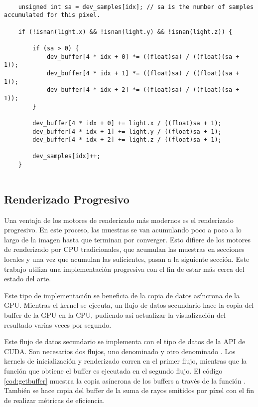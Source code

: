 \begin{minipage}[c]{0.95\textwidth}
\begin{lstlisting}[label={cod:sampleaccumulation}, caption={Código para la acumulación de luz por cada píxel}]
	
	unsigned int sa = dev_samples[idx]; // sa is the number of samples accumulated for this pixel.
	
	if (!isnan(light.x) && !isnan(light.y) && !isnan(light.z)) {

        if (sa > 0) {
            dev_buffer[4 * idx + 0] *= ((float)sa) / ((float)(sa + 1));
            dev_buffer[4 * idx + 1] *= ((float)sa) / ((float)(sa + 1));
            dev_buffer[4 * idx + 2] *= ((float)sa) / ((float)(sa + 1));
        }

        dev_buffer[4 * idx + 0] += light.x / ((float)sa + 1);
        dev_buffer[4 * idx + 1] += light.y / ((float)sa + 1);
        dev_buffer[4 * idx + 2] += light.z / ((float)sa + 1);

        dev_samples[idx]++;
    }
	
\end{lstlisting}
\end{minipage}
	
\subsection{Renderizado Progresivo}
\label{progressiverender}
		
Una ventaja de los motores de renderizado más modernos es el renderizado progresivo. En este proceso, las muestras se van acumulando poco a poco a lo largo de la imagen hasta que terminan por converger. Esto difiere de los motores de renderizado por CPU tradicionales, que acumulan las muestras en secciones locales y una vez que acumulan las suficientes, pasan a la siguiente sección. Este trabajo utiliza una implementación progresiva con el fin de estar más cerca del estado del arte.

Este tipo de implementación se beneficia de la copia de datos asíncrona de la GPU. Mientras el kernel se ejecuta, un flujo de datos secundario hace la copia del buffer de la GPU en la CPU, pudiendo así actualizar la visualización del resultado varias veces por segundo.

Este flujo de datos secundario se implementa con el tipo de datos  de la API de CUDA. Son necesarios dos flujos, uno denominado  y otro denominado . Los kernels de inicialización y renderizado corren en el primer flujo, mientras que la función que obtiene el buffer es ejecutada en el segundo flujo. El código \autoref{cod:getbuffer} muestra la copia asíncrona de los buffers a través de la función . También se hace copia del buffer de la suma de rayos emitidos por píxel  con el fin de realizar métricas de eficiencia.


